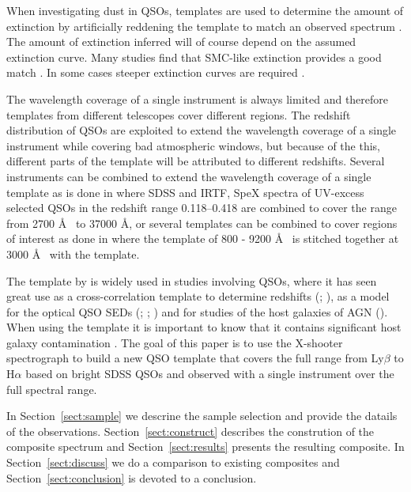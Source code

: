 \documentclass{aa}    %
\newcommand{\sectionname}{Section}
\newcommand{\Sect}[1]{\sectionname~\ref{sect:#1}}
\newcommand{\sect}[1]{\Sect{#1}}
\begin{document}
When investigating dust in QSOs, templates are used to determine the
amount of extinction by artificially reddening the template 
to match an observed spectrum 
\citep[e.g.,][]{Glikman2007,Urrutia2009,Wang2012,Fynbo2013,Krogager2015}. 
The amount of extinction inferred will of course depend on the
assumed extinction curve. Many studies find that SMC-like extinction provides
a good match \citep{Richards2003,Hopkins2004}. In some cases steeper extinction
curves are required \citep{Fynbo2013,Jiang2013,Leighly2014}.

The wavelength coverage of a single instrument is always limited and therefore
templates from different telescopes cover different regions. The redshift
distribution of QSOs are exploited to extend the wavelength coverage of a
single instrument while covering bad atmospheric windows, but because of the
this, different parts of the template will be attributed to different
redshifts. Several instruments can be combined to extend the wavelength
coverage of a single template as is done in \citep{Glikman2006} where SDSS
\citep{Gunn2006} and IRTF, SpeX \citep{Rayner2003} spectra of UV-excess selected
QSOs in the redshift range 0.118--0.418 are combined to
cover the range from 2700 \AA~ to 37000 \AA, or several templates can be
combined to cover regions of interest as done in \citep{Zhou2010} where the
template of \citep{VandenBerk2001} 800 - 9200 \AA~ is stitched together at 3000
\AA~ with the \citep{Glikman2006} template. 

The template by \cite{VandenBerk2001} is widely
used in studies involving QSOs, where it has seen great use as a
cross-correlation template to determine redshifts (\cite{Stoughton2002};
\cite{Rafiee2011}), as a model for the optical QSO SEDs (\cite{Croom2004};
\cite{Hopkins2006}; \cite{Hopkins2007}) and for studies of the host galaxies of
AGN (\cite{Kauffmann2003b}). When using the \citet{VandenBerk2001} template
it is important to know that it contains significant host galaxy contamination
\citep[e.g.,][their Fig.~5]{Fynbo2013}. The 
goal of this paper is to use the X-shooter spectrograph to build a new 
QSO template that covers the full range from Ly$\beta$ to H$\alpha$ based on bright
SDSS QSOs and observed with a single instrument over the full spectral range.

In
\sect{sample} we descrine the sample selection and provide the datails 
of the observations.
\sect{construct} describes the constrution of the composite spectrum
and \sect{results} presents the resulting composite. In \sect{discuss} we do a
comparison to existing composites and \sect{conclusion} is devoted to a
conclusion.
\end{document}
